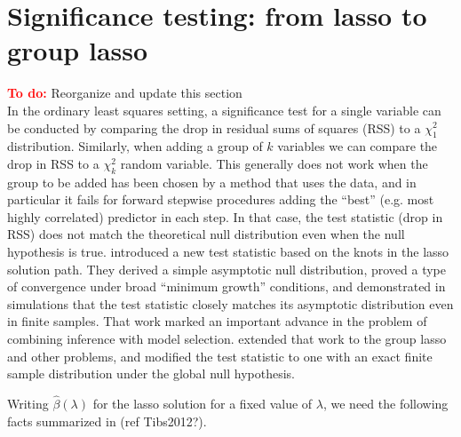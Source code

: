 \documentclass{imsart}
\newcommand{\todo}{\textcolor{red}{\textbf{To do: }}}
\begin{document}

\section{Significance testing: from lasso to group lasso}
\label{sec:testing}

\todo Reorganize and update this section \\

In the ordinary least squares setting, a significance test for a
single variable can be conducted by comparing the drop in residual
sums of squares (RSS) to a $\chi^2_1$ distribution. Similarly, when
adding a group of $k$ variables we can compare the drop in RSS to a
$\chi^2_k$ random variable. This generally does not work when the
group to be added has been chosen by a method that uses the data,
and in particular it fails for forward stepwise procedures adding
the ``best'' (e.g. most highly correlated) predictor in each step. In
that case, the test statistic (drop in RSS) does not match the
theoretical null distribution even when the null hypothesis is
true. \cite{significance:lasso} introduced a new test statistic based
on the knots in the lasso solution path. They derived a simple
asymptotic null distribution, proved a type of convergence under broad
``minimum growth'' conditions, and demonstrated in simulations that
the test statistic closely matches its asymptotic distribution even in
finite samples.  That work marked an important advance in the problem
of combining inference with model selection.  \cite{tests:adaptive}
extended that work to the group lasso \citep{grouplasso} and other
problems, and modified the test statistic to one with an exact finite
sample distribution under the global null hypothesis.




Writing $\hat \beta(\lambda)$ for the lasso solution for a fixed value of $\lambda$, we need
the following facts summarized in \cite{significance:lasso} (ref Tibs2012?).
\end{document}
